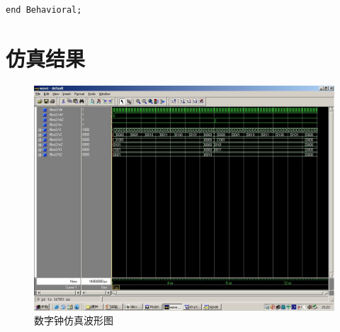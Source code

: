 \documentclass{article}
\begin{document}
\begin{CJK*}{UTF8}{gbsn}
\begin{center}
\begin{lstlisting}[caption = {数字钟代码清单}, label = {lst: clocklst}]
end Behavioral;
\end{lstlisting}
\end{center}

\section{仿真结果}
\begin{center}
\begin{figure}[h!]
\includegraphics[width=\textwidth]{tbw.jpg}
\caption{数字钟仿真波形图}
\label{fig: cfig}
\end{figure}
\end{center}

\end{CJK*}
\end{document}
